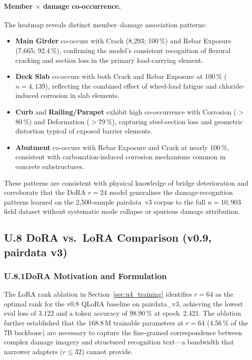 \documentclass[onecolumn]{article}
\begin{document}
\paragraph{Member $\times$ damage co-occurrence.}
The heatmap reveals distinct member--damage association patterns:
\begin{itemize}
  \item \textbf{Main Girder} co-occurs with Crack (8{,}293; 100\,\%)
        and Rebar Exposure (7{,}665; 92.4\,\%), confirming the model's
        consistent recognition of flexural cracking and section loss
        in the primary load-carrying element.
  \item \textbf{Deck Slab} co-occurs with both Crack and Rebar Exposure
        at 100\,\% ($n{=}4{,}139$), reflecting the combined effect of
        wheel-load fatigue and chloride-induced corrosion in slab elements.
  \item \textbf{Curb} and \textbf{Railing/Parapet} exhibit high co-occurrence
        with Corrosion ($>$80\,\%) and Deformation ($>$79\,\%),
        capturing steel-section loss and geometric distortion typical of
        exposed barrier elements.
  \item \textbf{Abutment} co-occurs with Rebar Exposure and Crack at
        nearly 100\,\%, consistent with carbonation-induced corrosion
        mechanisms common in concrete substructures.
\end{itemize}

These patterns are consistent with physical knowledge of bridge deterioration
and corroborate that the DoRA $r{=}24$ model generalises the damage-recognition
patterns learned on the 2{,}500-sample pairdata~v3 corpus to the full
$n{=}10{,}903$ field dataset without systematic mode collapse or
spurious damage attribution.

\subsection*{U.8 DoRA vs.\ LoRA Comparison (v0.9, pairdata v3)}
\label{sec:u8_dora}

\subsubsection*{U.8.1\enspace DoRA Motivation and Formulation}

The LoRA rank ablation in Section~\ref{sec:u4_training} identifies $r=64$
as the optimal rank for the v0.8 QLoRA baseline on pairdata\_v3,
achieving the lowest eval loss of $3.122$ and a token accuracy of
$98.90$\,\% at epoch~2.421.
The ablation further established that the $168.8$\,M trainable parameters
at $r=64$ (4.56\,\% of the 7B backbone) are necessary to capture the
fine-grained correspondence between complex damage imagery and structured
recognition text---a bandwidth that narrower adapters ($r\le32$) cannot
provide.
\end{document}
